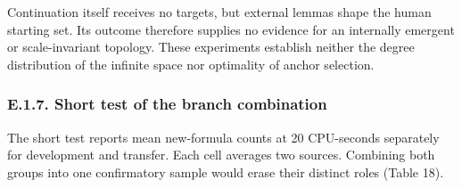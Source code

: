 \documentclass[pdflatex,sn-basic,Numbered]{sn-jnl}
\begin{document}
Continuation itself receives no targets, but external lemmas shape the human starting set. Its outcome therefore supplies no evidence for an internally emergent or scale-invariant topology. These experiments establish neither the degree distribution of the infinite space nor optimality of anchor selection.

\subsubsection*{E.1.7. Short test of the branch combination}\label{e.1.7.-short-test-of-the-branch-combination}

The short test reports mean new-formula counts at 20 CPU-seconds separately for development and transfer. Each cell averages two sources. Combining both groups into one confirmatory sample would erase their distinct roles (Table 18).

\begingroup
\small
\setlength{\tabcolsep}{3pt}
\renewcommand{\arraystretch}{1.13}
\end{document}
